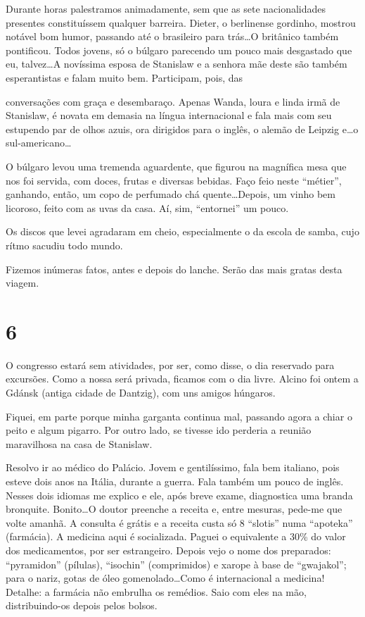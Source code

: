 Durante horas palestramos animadamente, sem que as sete nacionalidades presentes constituíssem qualquer barreira. Dieter, o berlinense gordinho, mostrou notável bom humor, passando até o brasileiro para trás\ldots O britânico também pontificou. Todos jovens, só o búlgaro parecendo um pouco mais desgastado que eu, talvez\ldots A novíssima esposa de Stanislaw e a senhora mãe deste são também esperantistas e falam muito bem. Participam, pois, das

conversações com graça e desembaraço. Apenas Wanda, loura e linda irmã de Stanislaw, é novata em demasia na língua internacional e fala mais com seu estupendo par de olhos azuis, ora dirigidos para o inglês, o alemão de Leipzig e\ldots o sul-americano\ldots

O búlgaro levou uma tremenda aguardente, que figurou na magnífica mesa que nos foi servida, com doces, frutas e diversas bebidas. Faço feio neste “métier”, ganhando, então, um copo de perfumado chá quente\ldots Depois, um vinho bem licoroso, feito com as uvas da casa. Aí, sim, “entornei” um pouco.

Os discos que levei agradaram em cheio, especialmente o da escola de samba, cujo rítmo sacudiu todo mundo.

Fizemos inúmeras fatos, antes e depois do lanche. Serão das mais gratas desta viagem.

\section*{6 \adfflatleafright {}}
O congresso estará sem atividades, por ser, como disse, o dia reservado para excursões. Como a nossa será privada, ficamos com o dia livre. Alcino foi ontem a Gdánsk (antiga cidade de Dantzig), com uns amigos húngaros.

Fiquei, em parte porque minha garganta continua mal, passando agora a chiar o peito e algum pigarro. Por outro lado, se tivesse ido perderia a reunião maravilhosa na casa de Stanislaw.

Resolvo ir ao médico do Palácio. Jovem e gentilíssimo, fala bem italiano, pois esteve dois anos na Itália, durante a guerra. Fala também um pouco de inglês. Nesses dois idiomas me explico e ele, após breve exame, diagnostica uma branda bronquite. Bonito\ldots O doutor preenche a receita e, entre mesuras, pede-me que volte amanhã. A consulta é grátis e a receita custa só 8 “slotis” numa “apoteka” (farmácia). A medicina aqui é socializada. Paguei o equivalente a 30\% do valor dos medicamentos, por ser estrangeiro. Depois vejo o nome dos preparados: “pyramidon” (pílulas), “isochin” (comprimidos) e xarope à base de “gwajakol”; para o nariz, gotas de óleo gomenolado\ldots Como é internacional a medicina! Detalhe: a farmácia não embrulha os remédios. Saio com eles na mão, distribuindo-os depois pelos bolsos.

